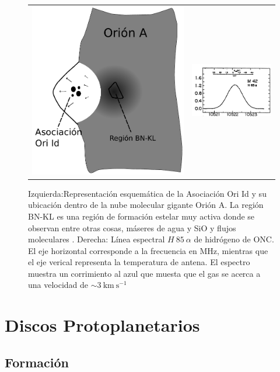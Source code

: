 \begin{figure}
  \begin{tabular}{lr}
    \includegraphics[width=0.4\linewidth]{./Figures/champagne} &
    \includegraphics[width=0.5\linewidth]{./Figures/H85-alpha}
    \end{tabular}
  \caption{Izquierda:Representación esquemática de la Asociación Ori Id y su ubicación dentro de la nube molecular gigante Orión A. La región BN-KL es una región de formación estelar muy activa donde se observan entre otras cosas, máseres de agua y SiO y flujos moleculares \citep{Stahler:2004}. Derecha: Línea espectral $H~85~\alpha$ de hidrógeno de ONC. El eje horizontal corresponde a la frecuencia en MHz, mientras que el eje verical representa la temperatura de antena. El espectro muestra un corrimiento al azul que muesta que el gas se acerca a una velocidad de $\sim 3\mathrm{~km~s^{-1}}$ \citep{Stahler:2004, Churchwell:1970}}
  \label{fig:champagne}
\end{figure}


\section{Discos Protoplanetarios}
\subsection{Formación}

